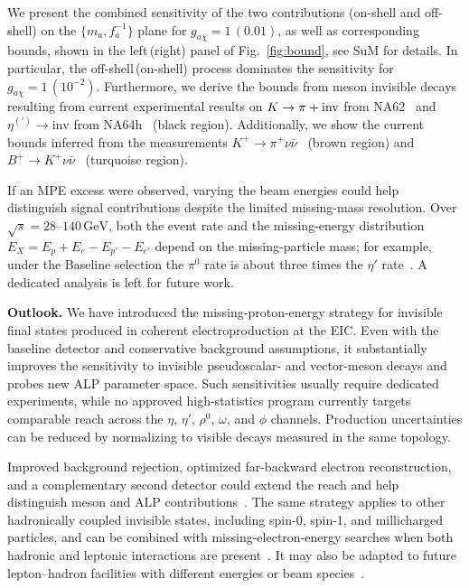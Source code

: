 \documentclass[aps,prd,preprintnumbers,superscriptaddress,nofootinbib,floatfix,twocolumn,notitlepage,reprint]{revtex4-2}
\newcommand{\GeV}{\mathrm{GeV}}
\begin{document}
We present the combined sensitivity of the two contributions (on-shell and off-shell) on the $\{m_a,f_a^{-1}\}$ plane for $g_{a\chi}=1\,(0.01)$, as well as corresponding bounds, shown in the left\,(right) panel of Fig.~\ref{fig:bound}, see SuM for details.
In particular, the off-shell\,(on-shell) process dominates the sensitivity for $g_{a\chi}=1\,(10^{-2})$. 
Furthermore, we derive the bounds from meson invisible decays resulting from current experimental results on $K\to \pi+\rm{inv}$ from NA62~\cite{NA62:2025upx} and $\eta^{(\prime)}\to \text{inv}$ from NA64h~\cite{NA64:2024mah} (black region). 
Additionally, we show the current bounds inferred from the measurements $K^+ \to \pi^+ \nu \bar\nu$~\cite{NA62:2021zjw} (brown region) and $B^+ \to K^+ \nu \bar\nu$~\cite{Chakraborty:2021wda,Belle-II:2023esi,Altmannshofer:2023hkn,Abumusabh:2025zsr} (turquoise region).

If an MPE excess were observed, varying the beam energies could help distinguish signal contributions despite the limited missing-mass resolution. Over $\sqrt{s}=28$--$140\,\GeV$, both the event rate and the missing-energy distribution $E_X=E_p+E_e-E_{p'}-E_{e'}$ depend on the missing-particle mass; for example, under the Baseline selection the $\pi^0$ rate is about three times the $\eta'$ rate~\cite{Balkin:2026whv}. A dedicated analysis is left for future work.

\textbf{Outlook.}
We have introduced the missing-proton-energy strategy for invisible final states produced in coherent electroproduction at the EIC. Even with the baseline detector and conservative background assumptions, it substantially improves the sensitivity to invisible pseudoscalar- and vector-meson decays and probes new ALP parameter space. Such sensitivities usually require dedicated experiments, while no approved high-statistics program currently targets comparable reach across the $\eta$, $\eta'$, $\rho^0$, $\omega$, and $\phi$ channels. Production uncertainties can be reduced by normalizing to visible decays measured in the same topology.

Improved background rejection, optimized far-backward electron reconstruction, and a complementary second detector could extend the reach and help distinguish meson and ALP contributions~\cite{BURKERT2023104032,NADEL-TURONSKI:2024/c,Chang:2025pgi}. The same strategy applies to other hadronically coupled invisible states, including spin-0, spin-1, and millicharged particles, and can be combined with missing-electron-energy searches when both hadronic and leptonic interactions are present~\cite{Davoudiasl:2025rpn}. It may also be adapted to future lepton--hadron facilities with different energies or beam species~\cite{Anderle:2021wcy,LHeC:2020van,Acosta:2022ejc,Davoudiasl:2024fiz,Akturk:2025ubm}.
\end{document}
